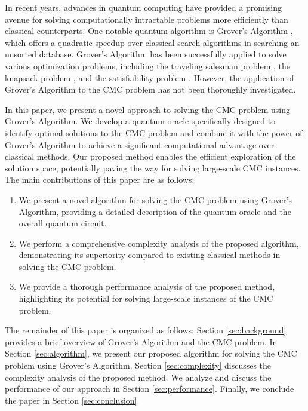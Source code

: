 In recent years, advances in quantum computing have provided a promising avenue for solving computationally intractable problems more efficiently than classical counterparts. One notable quantum algorithm is Grover's Algorithm \cite{Grover}, which offers a quadratic speedup over classical search algorithms in searching an unsorted database. Grover's Algorithm has been successfully applied to solve various optimization problems, including the traveling salesman problem \cite{TSP}, the knapsack problem \cite{Knapsack}, and the satisfiability problem \cite{SAT}. However, the application of Grover's Algorithm to the CMC problem has not been thoroughly investigated.

In this paper, we present a novel approach to solving the CMC problem using Grover's Algorithm. We develop a quantum oracle specifically designed to identify optimal solutions to the CMC problem and combine it with the power of Grover's Algorithm to achieve a significant computational advantage over classical methods. Our proposed method enables the efficient exploration of the solution space, potentially paving the way for solving large-scale CMC instances. The main contributions of this paper are as follows:

\begin{enumerate}
    \item We present a novel algorithm for solving the CMC problem using Grover's Algorithm, providing a detailed description of the quantum oracle and the overall quantum circuit.
    \item We perform a comprehensive complexity analysis of the proposed algorithm, demonstrating its superiority compared to existing classical methods in solving the CMC problem.
    \item We provide a thorough performance analysis of the proposed method, highlighting its potential for solving large-scale instances of the CMC problem.
\end{enumerate}

The remainder of this paper is organized as follows: Section \ref{sec:background} provides a brief overview of Grover's Algorithm and the CMC problem. In Section \ref{sec:algorithm}, we present our proposed algorithm for solving the CMC problem using Grover's Algorithm. Section \ref{sec:complexity} discusses the complexity analysis of the proposed method. We analyze and discuss the performance of our approach in Section \ref{sec:performance}. Finally, we conclude the paper in Section \ref{sec:conclusion}.



